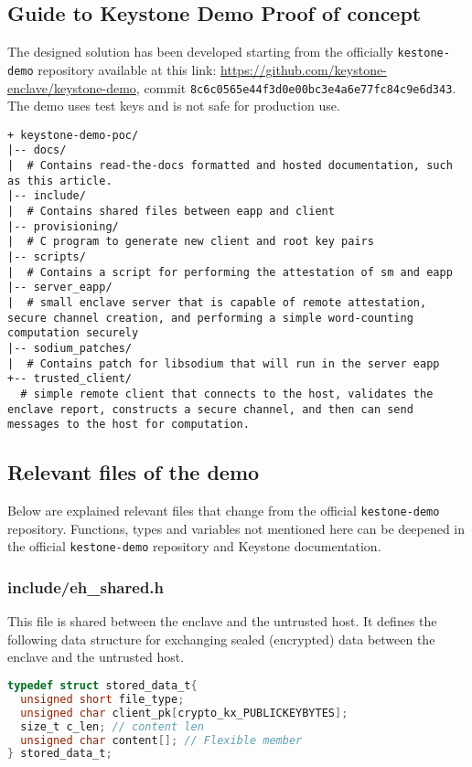\subsection{Guide to Keystone Demo Proof of concept}
The designed solution has been developed starting from the officially \texttt{kestone-demo} repository available at this link: \url{https://github.com/keystone-enclave/keystone-demo}, commit \texttt{8c6c0565e44f3d0e00bc3e4a6e77fc84c9e6d343}. The demo uses test keys and is not safe for production use. \\
\begin{lstlisting}[frame=single]
+ keystone-demo-poc/
|-- docs/
|  # Contains read-the-docs formatted and hosted documentation, such as this article.
|-- include/
|  # Contains shared files between eapp and client
|-- provisioning/
|  # C program to generate new client and root key pairs
|-- scripts/
|  # Contains a script for performing the attestation of sm and eapp
|-- server_eapp/
|  # small enclave server that is capable of remote attestation, secure channel creation, and performing a simple word-counting computation securely
|-- sodium_patches/
|  # Contains patch for libsodium that will run in the server eapp
+-- trusted_client/
  # simple remote client that connects to the host, validates the enclave report, constructs a secure channel, and then can send messages to the host for computation.       
\end{lstlisting}
\newpage
\subsection{Relevant files of the demo}
Below are explained relevant files that change from the official \texttt{kestone-demo} repository.
Functions, types and variables not mentioned here can be deepened in the official \texttt{kestone-demo} repository and Keystone documentation.
\subsubsection{include/eh\_shared.h}
This file is shared between the enclave and the untrusted host. It defines the following data structure for exchanging sealed (encrypted) data between the enclave and the untrusted host. \\

\begin{lstlisting}[language=C,frame=single]
typedef struct stored_data_t{
  unsigned short file_type;
  unsigned char client_pk[crypto_kx_PUBLICKEYBYTES];
  size_t c_len; // content len 
  unsigned char content[]; // Flexible member
} stored_data_t;    
\end{lstlisting}


